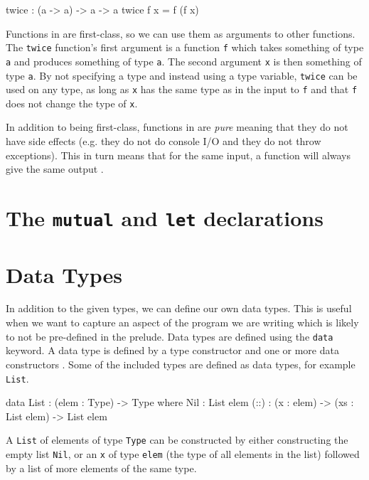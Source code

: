    \begin{code}[caption={A function with a function as an argument}]
        twice : (a -> a) -> a -> a
        twice f x = f (f x)
    \end{code}
    
    Functions in \Idris are first-class, so we can use them as arguments to other functions. The \texttt{twice} function's first argument is a function \texttt{f} which takes something of type \texttt{a} and produces something of type \texttt{a}. The second argument \texttt{x} is then something of type \texttt{a}. By not specifying a type and instead using a type variable, \texttt{twice} can be used on any type, as long as \texttt{x} has the same type as in the input to \texttt{f} and that \texttt{f} does not change the type of \texttt{x}.
    
    In addition to being first-class, functions in \Idris are \textit{pure} meaning that they do not have side effects (e.g. they do not do console I/O and they do not throw exceptions). This in turn means that for the same input, a function will always give the same output \cite{brady_2017}.

\section{The \texttt{mutual} and \texttt{let} declarations}

\section{Data Types}
    In addition to the given types, we can define our own data types. This is useful when we want to capture an aspect of the program we are writing which is likely to not be pre-defined in the \Idris prelude. Data types are defined using the \texttt{data} keyword. A data type is defined by a type constructor and one or more data constructors \cite{brady_2017}. Some of the included types are defined as data types, for example \texttt{List}.
    
    \begin{code}[caption={\texttt{List} as defined in the \Idris prelude}]
        data List : (elem : Type) -> Type where
            Nil  : List elem
            (::) : (x : elem) -> (xs : List elem) -> List elem 
    \end{code}
    A \texttt{List} of elements of type \texttt{Type} can be constructed by either constructing the empty list \texttt{Nil}, or an \texttt{x} of type \texttt{elem} (the type of all elements in the list) followed by a list of more elements of the same type.
    
